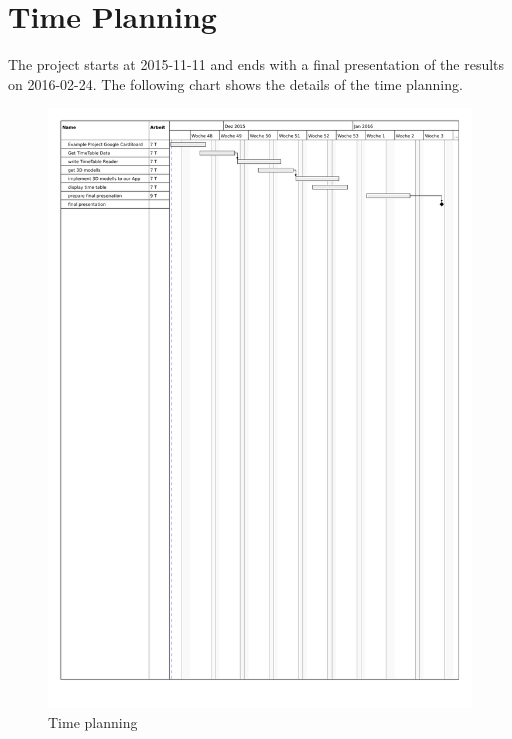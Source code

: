 \documentclass[]{report}
\begin{document}
\section{Time Planning}
The project starts at 2015-11-11 and ends with a final presentation of the results on 2016-02-24. The following chart shows the details of the time planning.
\begin{figure}[h!]
\centering
\includegraphics[scale=0.5]{chart}
\caption{Time planning}
\label{fig:method}
\end{figure}
\end{document}

